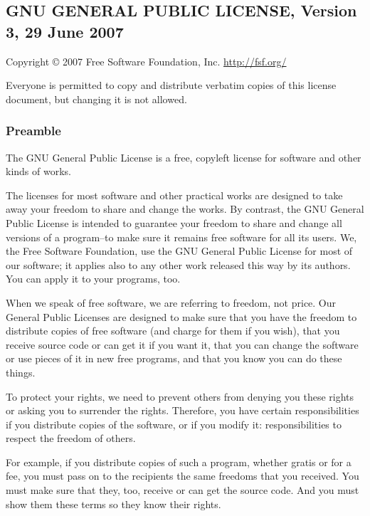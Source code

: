 \documentclass[a4paper, 11pt, twoside]{article}
\begin{document}
\begingroup
\fontsize{7pt}{8pt}
\selectfont

\subsection{GNU GENERAL PUBLIC LICENSE, Version 3, 29 June 2007}

Copyright © 2007 Free Software Foundation, Inc. \href{http://fsf.org/}{http://fsf.org/}

Everyone is permitted to copy and distribute verbatim copies of this license document, but changing it is not allowed.

\subsubsection{Preamble}

The GNU General Public License is a free, copyleft license for software and other kinds of works.

The licenses for most software and other practical works are designed to take away your freedom to share and change the works. By contrast, the GNU General Public License is intended to guarantee your freedom to share and change all versions of a program--to make sure it remains free software for all its users. We, the Free Software Foundation, use the GNU General Public License for most of our software; it applies also to any other work released this way by its authors. You can apply it to your programs, too.

When we speak of free software, we are referring to freedom, not price. Our General Public Licenses are designed to make sure that you have the freedom to distribute copies of free software (and charge for them if you wish), that you receive source code or can get it if you want it, that you can change the software or use pieces of it in new free programs, and that you know you can do these things.

To protect your rights, we need to prevent others from denying you these rights or asking you to surrender the rights. Therefore, you have certain responsibilities if you distribute copies of the software, or if you modify it: responsibilities to respect the freedom of others.

For example, if you distribute copies of such a program, whether gratis or for a fee, you must pass on to the recipients the same freedoms that you received. You must make sure that they, too, receive or can get the source code. And you must show them these terms so they know their rights.
\end{document}
